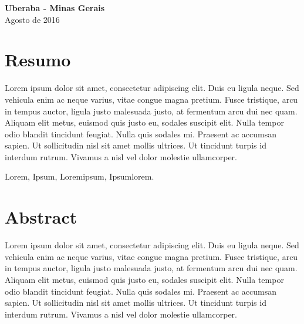 \documentclass[12pt, a4paper,oneside]{book}
\begin{document}
\vspace{8cm}


\begin{center}
\textbf{Uberaba - Minas Gerais} \\
Agosto de 2016
\end{center}













\pagestyle{myheadings} %
\newpage
\thispagestyle{empty}
\chapter*{Resumo}

Lorem ipsum dolor sit amet, consectetur adipiscing elit. Duis eu ligula neque. Sed vehicula enim ac neque varius, vitae congue magna pretium. Fusce tristique, arcu in tempus auctor, ligula justo malesuada justo, at fermentum arcu dui nec quam. Aliquam elit metus, euismod quis justo eu, sodales suscipit elit. Nulla tempor odio blandit tincidunt feugiat. Nulla quis sodales mi. Praesent ac accumsan sapien. Ut sollicitudin nisl sit amet mollis ultrices. Ut tincidunt turpis id interdum rutrum. Vivamus a nisl vel dolor molestie ullamcorper.
 
 Lorem, Ipsum, Loremipsum, Ipsumlorem.


\newpage
\thispagestyle{empty}
\chapter*{Abstract}

Lorem ipsum dolor sit amet, consectetur adipiscing elit. Duis eu ligula neque. Sed vehicula enim ac neque varius, vitae congue magna pretium. Fusce tristique, arcu in tempus auctor, ligula justo malesuada justo, at fermentum arcu dui nec quam. Aliquam elit metus, euismod quis justo eu, sodales suscipit elit. Nulla tempor odio blandit tincidunt feugiat. Nulla quis sodales mi. Praesent ac accumsan sapien. Ut sollicitudin nisl sit amet mollis ultrices. Ut tincidunt turpis id interdum rutrum. Vivamus a nisl vel dolor molestie ullamcorper. 
\end{document}
